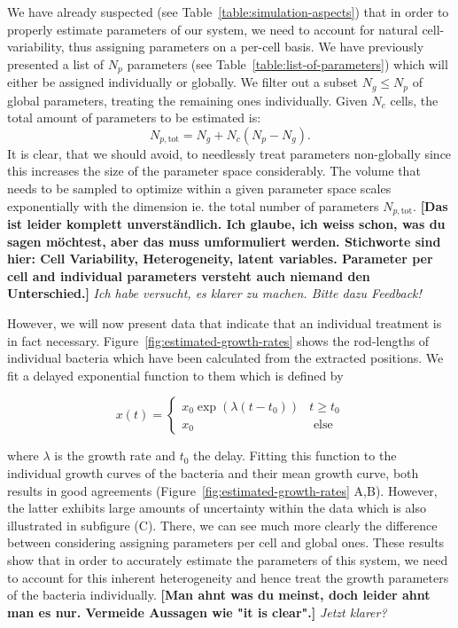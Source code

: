 \documentclass{article}
\begin{document}
We have already suspected (see Table~\ref{table:simulation-aspects}) that in order to properly
estimate parameters of our system, we need to account for natural cell-variability, thus assigning
parameters on a per-cell basis.
We have previously presented a list of $N_p$ parameters (see Table~\ref{table:list-of-parameters})
which will either be assigned individually or globally.
We filter out a subset $N_g\leq N_p$ of global parameters, treating the remaining ones individually.
Given $N_c$ cells, the total amount of parameters to be estimated is:
\begin{equation}
    N_{p,\text{tot}} = N_g + N_c (N_p - N_g).
\end{equation}
It is clear, that we should avoid, to needlessly treat parameters non-globally since this increases
the size of the parameter space considerably.
The volume that needs to be sampled to optimize within a given parameter space scales exponentially
with the dimension ie. the total number of parameters $N_{p,\text{tot}}$.
\textbf{[Das ist leider komplett unverständlich. Ich glaube, ich weiss schon, was du sagen möchtest, aber das muss umformuliert werden. Stichworte sind hier: Cell Variability, Heterogeneity, latent variables. Parameter per cell and individual parameters versteht auch niemand den Unterschied.]}
\textit{Ich habe versucht, es klarer zu machen. Bitte dazu Feedback!}

However, we will now present data that indicate that an individual treatment is in fact necessary.
Figure~\ref{fig:estimated-growth-rates} shows the rod-lengths of individual bacteria which have been
calculated from the extracted positions.
We fit a delayed exponential function to them which is defined by

\begin{equation}
    x(t) =
    \left\{\begin{array}{ll}
            x_0 \exp(\lambda (t-t_0)) & t\geq t_0\\
            x_0 & \text{ else}
    \end{array}\right.
\end{equation}

where $\lambda$ is the growth rate and $t_0$ the delay.
Fitting this function to the individual growth curves of the bacteria and their mean growth curve,
both results in good agreements (Figure~\ref{fig:estimated-growth-rates} A,B).
However, the latter exhibits large amounts of uncertainty within the data which is also illustrated
in subfigure (C).
There, we can see much more clearly the difference between considering assigning parameters per cell
and global ones.
These results show that in order to accurately estimate the parameters of this system, we need to
account for this inherent heterogeneity and hence treat the growth parameters of the bacteria
individually.
\textbf{[Man ahnt was du meinst, doch leider ahnt man es nur. Vermeide Aussagen wie "it is clear".]}
\textit{Jetzt klarer?}
\end{document}
